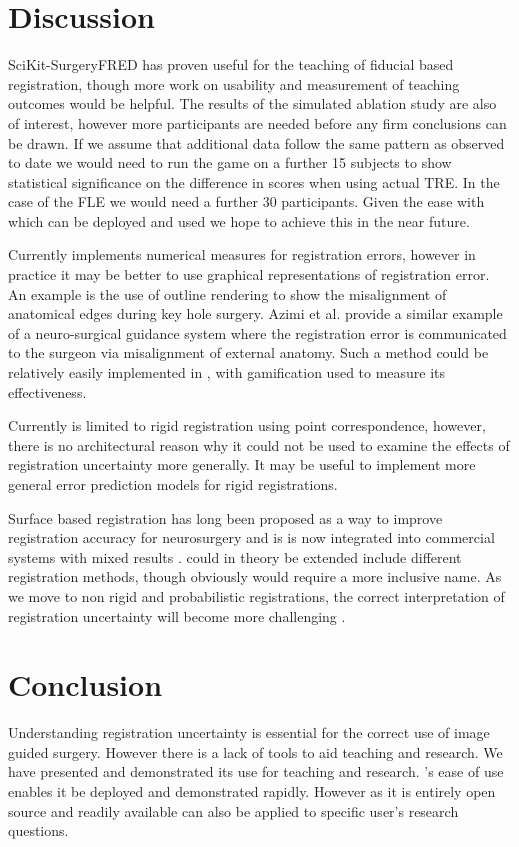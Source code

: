 \section{Discussion}
SciKit-SurgeryFRED has proven useful for the teaching of fiducial based registration,
though more work on usability and measurement of teaching outcomes would be helpful. 
The results of the simulated ablation study 
are also of interest, however more participants are needed before any firm conclusions
can be drawn.
If we assume that additional data follow the same pattern as observed to date we
would need to run the game on a further 15 subjects to show statistical significance
on the difference in scores when using actual \gls{TRE}. In the case of the
\gls{FLE} we would need a further 30 participants. Given the ease with
which \fred can be deployed and used we hope to achieve this in the near future.

Currently \fred implements numerical measures for registration errors, however
in practice it may be better to use
graphical representations of registration error. An example is the use of
outline rendering to show the misalignment of anatomical edges during key hole 
surgery\cite{PMID:29663273}. Azimi et al. \cite{10.1007/978-3-030-59716-0_7} 
provide a similar example of a neuro-surgical guidance system where the 
registration error is communicated to the surgeon via misalignment of 
external anatomy. Such a method could be relatively easily implemented in \fredns, with
gamification used to measure its effectiveness. 

Currently \fred is limited to rigid registration using point correspondence, however, 
there is no architectural reason why it could not be used to examine the 
effects of registration uncertainty more generally. It may be useful to implement 
more general error prediction models for rigid registrations\cite{4359072,5629373}.

Surface based registration has long been proposed as a way to improve 
registration accuracy for neurosurgery \cite{736031} and is 
is now integrated into commercial systems with mixed results \cite{mongen2020}.
\fred could in 
theory be extended include different registration methods, though obviously would 
require a more inclusive name. As we move to non rigid and 
probabilistic registrations, the correct interpretation of registration 
uncertainty will become more challenging \cite{10.1007/978-3-030-59716-0_26}.

\section{Conclusion}
Understanding registration uncertainty is essential for the correct 
use of image guided surgery. However there is a lack of tools to 
aid teaching and research.
We have presented \fred and demonstrated its use for teaching and research. 
\fredns's ease of use enables it be deployed and demonstrated rapidly. However as
it is entirely open source and readily available \fred can also be applied to 
specific user's research questions. 




